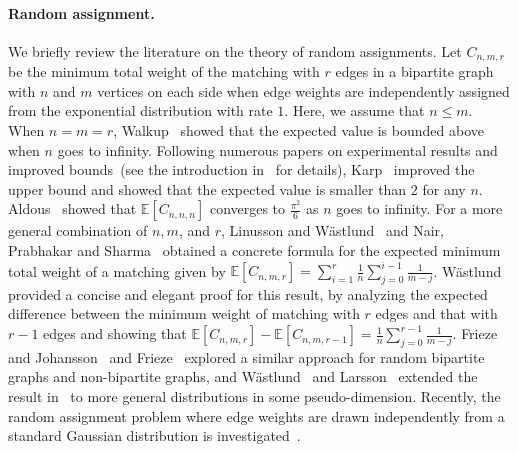 \paragraph{Random assignment.}
We briefly review the literature on the theory of random assignments. 
Let $C_{n,m,r}$ be the minimum total weight of the matching with $r$ edges in a bipartite graph with $n$ and $m$ vertices on each side when edge weights are independently assigned from the exponential distribution with rate $1$. Here, we assume that $n\leq m$. 
When $n=m=r$, Walkup~\cite{Walkup1979} showed that the expected value is bounded above when $n$ goes to infinity. 
Following numerous papers on experimental results and improved bounds~(see the introduction in~\cite{Wastlund2009} for details), Karp~\cite{Karp1987} improved the upper bound and showed that the expected value is smaller than $2$ for any $n$. Aldous~\cite{Aldous1992,Aldous2001} showed that $\mathbb{E}[C_{n,n,n}]$ converges to $\frac{\pi^2}{6}$ as $n$ goes to infinity. 
For a more general combination of $n,m$, and $r$, Linusson and W\"{a}stlund~\cite{LinussonWastlund2001} and Nair, Prabhakar and Sharma~\cite{NairPrabhakarSharma2006}
obtained a concrete formula for the expected minimum total weight of a matching
given by $\mathbb{E}[C_{n,m,r}]  = \sum_{i=1}^r \frac{1}{n} \sum_{j=0}^{i-1} \frac{1}{m-j}$.
W\"{a}stlund~\cite{Wastlund2009} provided a concise and elegant proof for this result, by analyzing the expected difference between the minimum weight of matching with $r$ edges and that with $r-1$ edges and showing that $\mathbb{E}[C_{n,m,r}] - \mathbb{E}[C_{n,m,r-1}] = \frac{1}{n}\sum_{j=0}^{r-1}\frac{1}{m-j}$.
Frieze and Johansson~\cite{FriezeJohansson2017} and Frieze~\cite{Frieze2021} explored a similar approach for random bipartite graphs and non-bipartite graphs, and W\"{a}stlund~\cite{Wastlund2012} and Larsson~\cite{Larsson2021} extended the result in~\cite{Wastlund2009} to more general distributions in some pseudo-dimension.
Recently, the random assignment problem where edge weights are drawn independently from a standard Gaussian distribution is investigated~\cite{MordantSegers2021}.

